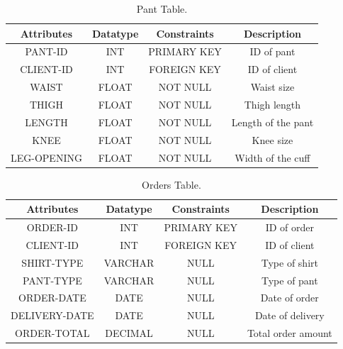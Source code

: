\documentclass[12pt, letter paper]{report}
\begin{document}
{\begin{center}
\begin{table}[h!]
\centering
    \begin{tabular}{|c|c|c|c|}
    \hline
      Attributes &Datatype &Constraints&Description  \\
      \hline
      \hline
         PANT-ID&INT&PRIMARY KEY&ID of pant  \\
         \hline
         CLIENT-ID&INT&FOREIGN KEY&ID of client\\
         \hline
         WAIST&FLOAT&NOT NULL& Waist size\\ 
         \hline
         THIGH&FLOAT&NOT NULL& Thigh length\\ 
         \hline
         LENGTH&FLOAT&NOT NULL& Length of the pant\\
         \hline
         KNEE&FLOAT&NOT NULL&Knee size\\
         \hline
         LEG-OPENING&FLOAT&NOT NULL&Width of the cuff\\
         \hline
    \end{tabular}
    \caption{Pant Table.}
\label{table:3}
    \end{table}
\end{center}

\begin{center}
\begin{table}[h!]
\centering
    \begin{tabular}{|c|c|c|c|}
    \hline
      Attributes &Datatype &Constraints&Description  \\
      \hline
      \hline
         ORDER-ID&INT&PRIMARY KEY&ID of order \\
         \hline
         CLIENT-ID&INT&FOREIGN KEY&ID of client\\
         \hline
         SHIRT-TYPE&VARCHAR&NULL& Type of shirt\\ 
         \hline
         PANT-TYPE&VARCHAR&NULL& Type of pant\\ 
         \hline
         ORDER-DATE&DATE&NULL& Date of order\\
         \hline
         DELIVERY-DATE&DATE&NULL&Date of delivery\\
         \hline
         ORDER-TOTAL&DECIMAL&NULL&Total order amount\\
         \hline
    \end{tabular}
    \caption{Orders Table.}
\label{table:4}
    \end{table}
\end{center}

}
\end{document}
